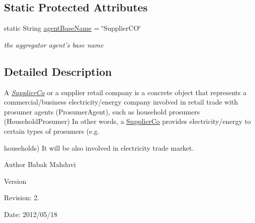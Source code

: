 \subsection*{Static Protected Attributes}
\begin{DoxyCompactItemize}
\item 
\hypertarget{classuk_1_1ac_1_1dmu_1_1iesd_1_1cascade_1_1agents_1_1aggregators_1_1_supplier_co_neural_map_a55a5ed092a87d91bcc6cb8617721c5f0}{static String \hyperlink{classuk_1_1ac_1_1dmu_1_1iesd_1_1cascade_1_1agents_1_1aggregators_1_1_supplier_co_neural_map_a55a5ed092a87d91bcc6cb8617721c5f0}{agent\-Base\-Name} = \char`\"{}Supplier\-C\-O\char`\"{}}\label{classuk_1_1ac_1_1dmu_1_1iesd_1_1cascade_1_1agents_1_1aggregators_1_1_supplier_co_neural_map_a55a5ed092a87d91bcc6cb8617721c5f0}

\begin{DoxyCompactList}\small\item\em the aggregator agent's base name \end{DoxyCompactList}\end{DoxyCompactItemize}


\subsection{Detailed Description}
A {\itshape \hyperlink{classuk_1_1ac_1_1dmu_1_1iesd_1_1cascade_1_1agents_1_1aggregators_1_1_supplier_co}{Supplier\-Co}} or a supplier retail company is a concrete object that represents a commercial/business electricity/energy company involved in retail trade with prosumer agents ({\ttfamily Prosumer\-Agent}), such as household prosumers ({\ttfamily Household\-Prosumer}) In other words, a {\ttfamily \hyperlink{classuk_1_1ac_1_1dmu_1_1iesd_1_1cascade_1_1agents_1_1aggregators_1_1_supplier_co}{Supplier\-Co}} provides electricity/energy to certain types of prosumers (e.\-g. 

households) It will be also involved in electricity trade market.

\begin{DoxyAuthor}{Author}
Babak Mahdavi 
\end{DoxyAuthor}
\begin{DoxyVersion}{Version}

\end{DoxyVersion}
\begin{DoxyParagraph}{Revision\-:}
2. 
\end{DoxyParagraph}
\begin{DoxyParagraph}{Date\-:}
2012/05/18 
\end{DoxyParagraph}


